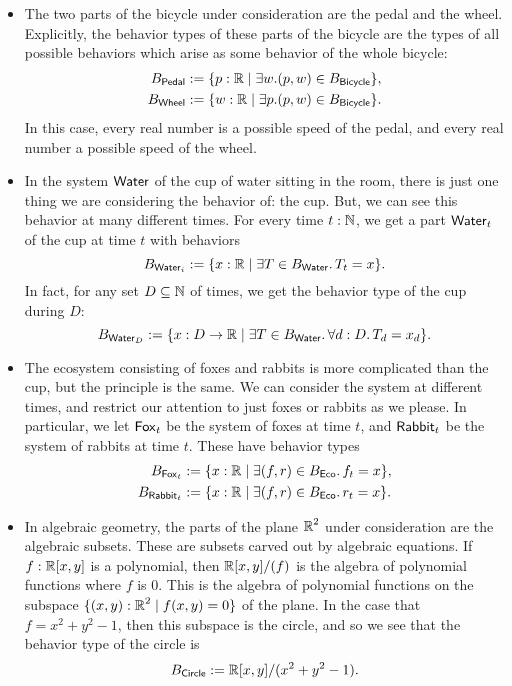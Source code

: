 \begin{ex}
\begin{itemize}
    \item The two parts of the bicycle under consideration are the pedal and the wheel. Explicitly, the behavior types of these parts of the bicycle are the types of all possible behaviors which arise as some behavior of the whole bicycle:
    \begin{align*}
        B_{\mathsf{{Pedal}}} &:= \{ p : \operatorname{\mathbb{R}} \mid \exists w. (p, w) \in B_{\mathsf{{Bicycle}}}\},\\
        B_{\mathsf{{Wheel}}} &:= \{ w : \operatorname{\mathbb{R}} \mid \exists p. (p, w) \in B_{\mathsf{{Bicycle}}}\}.
    \end{align*}
    In this case, every real number is a possible speed of the pedal, and every real number a possible speed of the wheel.
    
    \item In the system $\mathsf{{Water}}$ of the cup of water sitting in the room, there is just one thing we are considering the behavior of: the cup. But, we can see this behavior at many different times. For every time $t : \operatorname{\mathbb{N}}$, we get a part $\mathsf{{Water}}_t$ of the cup at time $t$ with behaviors
    $$B_{\mathsf{{Water}}_i} := \{ x : \operatorname{\mathbb{R}} \mid \exists T \in B_{\mathsf{{Water}}}.\, T_t = x\}.$$
    In fact, for any set $D \subseteq \operatorname{\mathbb{N}}$ of times, we get the behavior type of the cup during $D$:
    $$B_{\mathsf{{Water}}_D} := \{ x : D \to \operatorname{\mathbb{R}} \mid \exists T \in B_{\mathsf{{Water}}}.\, \forall d : D.\, T_d = x_d\}.$$
    
    \item The ecosystem consisting of foxes and rabbits is more complicated than the cup, but the principle is the same. We can consider the system at different times, and restrict our attention to just foxes or rabbits as we please. In particular, we let $\mathsf{{Fox}}_t$ be the system of foxes at time $t$, and $\mathsf{{Rabbit}}_t$ be the system of rabbits at time $t$. These have behavior types
    \begin{align*}
        B_{\mathsf{{Fox}}_t} &:= \{ x : \operatorname{\mathbb{R}} \mid \exists (f, r) \in B_{\mathsf{{Eco}}}.\, f_t = x\},\\
        B_{\mathsf{{Rabbit}}_t} &:= \{ x : \operatorname{\mathbb{R}} \mid \exists (f, r) \in B_{\mathsf{{Eco}}}.\, r_t = x\}.
    \end{align*}
    
    \item In algebraic geometry, the parts of the plane $\operatorname{\mathbb{R}}^2$ under consideration are the algebraic subsets. These are subsets carved out by algebraic equations. If $f : \operatorname{\mathbb{R}}[x, y]$ is a polynomial, then $\operatorname{\mathbb{R}}[x, y]/(f)$ is the algebra of polynomial functions where $f$ is $0$. This is the algebra of polynomial functions on the subspace $\{(x, y) : \operatorname{\mathbb{R}}^2 \mid f(x, y) = 0\}$ of the plane. In the case that $f = x^2 + y^2 - 1$, then this subspace is the circle, and so we see that the behavior type of the circle is
    $$B_{\mathsf{{Circle}}} := \operatorname{\mathbb{R}}[x, y]/(x^2 + y^2 - 1).$$
    
\end{itemize}
\end{ex}

